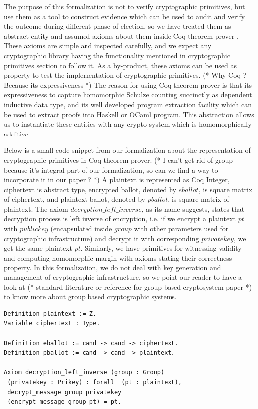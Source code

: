 \documentclass{llncs}
\begin{document}
The purpose of this formalization is not to verify cryptographic primitives, 
but use them as a tool to construct evidence which can be used 
to audit and verify the outcome during different phase 
of election, so we have treated them as abstract entity and assumed 
axioms about them inside Coq theorem prover \cite{Bertot:2004:ITP}.
These axioms are 
simple and inspected carefully, and we expect any cryptographic 
library having the functionality mentioned in cryptographic primitives
section to follow it. As a by-product, these axioms can be used 
as property to test the  implementation of cryptographic primitives.
(* Why Coq ? Because its expressiveness *) The reason for using Coq 
theorem prover is that its expressiveness to capture homomorphic 
Schulze counting succinctly as dependent inductive data type, and 
its well developed program extraction \cite{Letouzey:2003:NEC} facility 
which can be used to extract proofs into Haskell or OCaml program.    
This abstraction allows us to
instantiate these entities with any crypto-system which is homomorphically 
additive. 

 Below is a small code snippet from our formalization
about the representation of cryptographic primitives in Coq theorem prover.
(* I can't get rid of group because it's integral part of our formalization,
 so can we find a way to incorporate it in our paper ? *)
A plaintext is represented as Coq Integer, ciphertext is abstract type, 
encrypted ballot, denoted by $eballot$,  is square matrix of ciphertext, and
plaintext ballot, denoted by $pballot$,  is square matrix of plaintext.
The axiom  $decryption\_left\_inverse$, as its name suggests, states 
that decryption process is left inverse of encryption, i.e.  
if we encrypt a plaintext $pt$ with $publickey$ 
(encapsulated inside $group$ with other parameters 
used for cryptographic infrastructure) and decrypt it with corresponding 
$privatekey$, we get the same plaintext $pt$. Similarly, we have 
primitives for witnessing validity and computing homomorphic margin with
axioms stating their correctness property.
In this formalization, we do not deal with key generation and management of
cryptographic infrastructure, 
so we point our reader to have a look at (* standard literature or 
reference for group based cryptosystem paper *)
to know more about group based cryptographic systems.
   
\begin{lstlisting}[frame=single,basicstyle=\ttfamily\footnotesize]
Definition plaintext := Z.
Variable ciphertext : Type. 

Definition eballot := cand -> cand -> ciphertext.
Definition pballot := cand -> cand -> plaintext.

Axiom decryption_left_inverse (group : Group) 
 (privatekey : Prikey) : forall  (pt : plaintext),
 decrypt_message group privatekey 
 (encrypt_message group pt) = pt.
\end{lstlisting}
\end{document}
